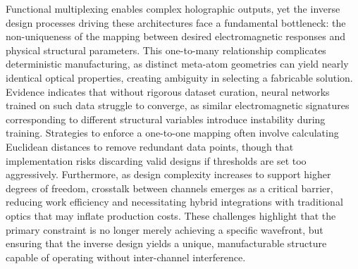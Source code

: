 Functional multiplexing enables complex holographic outputs, yet the inverse design processes driving these architectures face a fundamental bottleneck: the non-uniqueness of the mapping between desired electromagnetic responses and physical structural parameters. This one-to-many relationship complicates deterministic manufacturing, as distinct meta-atom geometries can yield nearly identical optical properties, creating ambiguity in selecting a fabricable solution. Evidence indicates that without rigorous dataset curation, neural networks trained on such data struggle to converge, as similar electromagnetic signatures corresponding to different structural variables introduce instability during training. Strategies to enforce a one-to-one mapping often involve calculating Euclidean distances to remove redundant data points, though that implementation risks discarding valid designs if thresholds are set too aggressively. Furthermore, as design complexity increases to support higher degrees of freedom, crosstalk between channels emerges as a critical barrier, reducing work efficiency and necessitating hybrid integrations with traditional optics that may inflate production costs. These challenges highlight that the primary constraint is no longer merely achieving a specific wavefront, but ensuring that the inverse design yields a unique, manufacturable structure capable of operating without inter-channel interference. \citep{doi_10_1088_1361_6463_ad3e05_d24e0a0a} \citep{doi_10_1515_nanoph_2025_0269_b999ce93} \citep{doi_10_1038_s41467_026_76714_x_8ca5d39b}

